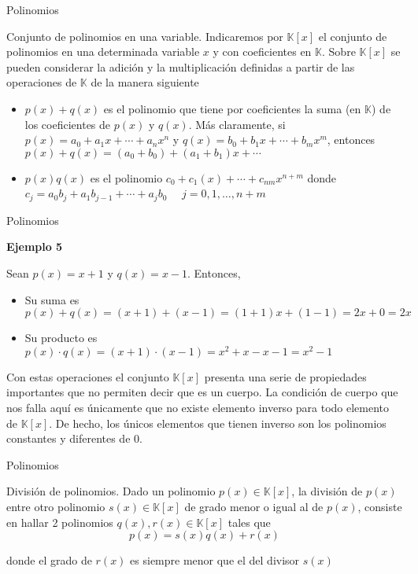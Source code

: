 \documentclass[
  ignorenonframetext,
]{beamer}
\providecommand{\tightlist}{%
  \setlength{\itemsep}{0pt}\setlength{\parskip}{0pt}}
\begin{document}
\begin{frame}{Polinomios}
\protect\hypertarget{polinomios-3}{}

Conjunto de polinomios en una variable. Indicaremos por
\(\mathbb{K}[x]\) el conjunto de polinomios en una determinada variable
\(x\) y con coeficientes en \(\mathbb{K}\). Sobre \(\mathbb{K}[x]\) se
pueden considerar la adición y la multiplicación definidas a partir de
las operaciones de \(\mathbb{K}\) de la manera siguiente

\begin{itemize}
\tightlist
\item
  \(p(x)+q(x)\) es el polinomio que tiene por coeficientes la suma (en
  \(\mathbb{K}\)) de los coeficientes de \(p(x)\) y \(q(x)\). Más
  claramente, si \(p(x)=a_0+a_1x+\cdots+a_nx^n\) y
  \(q(x)=b_0+b_1x+\cdots+b_mx^m\), entonces
  \(p(x)+q(x)=(a_0+b_0)+(a_1+b_1)x+\cdots\)
\item
  \(p(x)q(x)\) es el polinomio \(c_0+c_1(x)+\cdots+c_{nm}x^{n+m}\) donde
  \(c_j=a_0b_j+a_1b_{j-1}+\cdots+a_jb_0\) \(\quad j=0,1,\dots,n+m\)
\end{itemize}

\end{frame}

\begin{frame}{Polinomios}
\protect\hypertarget{polinomios-4}{}

\textbf{Ejemplo 5}

Sean \(p(x) = x+1\) y \(q(x) = x-1\). Entonces,

\begin{itemize}
\tightlist
\item
  Su suma es \(p(x)+q(x)=(x+1)+(x-1) = (1+1)x+(1-1) = 2x+0=2x\)
\item
  Su producto es \(p(x)\cdot q(x)=(x+1)\cdot(x-1)=x^2+x-x-1=x^2-1\)
\end{itemize}

Con estas operaciones el conjunto \(\mathbb{K}[x]\) presenta una serie
de propiedades importantes que no permiten decir que es un cuerpo. La
condición de cuerpo que nos falla aquí es únicamente que no existe
elemento inverso para todo elemento de \(\mathbb{K}[x]\). De hecho, los
únicos elementos que tienen inverso son los polinomios constantes y
diferentes de 0.

\end{frame}

\begin{frame}{Polinomios}
\protect\hypertarget{polinomios-5}{}

División de polinomios. Dado un polinomio \(p(x)\in\mathbb{K}[x]\), la
división de \(p(x)\) entre otro polinomio \(s(x)\in\mathbb{K}[x]\) de
grado menor o igual al de \(p(x)\), consiste en hallar 2 polinomios
\(q(x),r(x)\in\mathbb{K}[x]\) tales que \[p(x) = s(x)q(x)+r(x)\]

donde el grado de \(r(x)\) es siempre menor que el del divisor \(s(x)\)

\end{frame}
\end{document}

